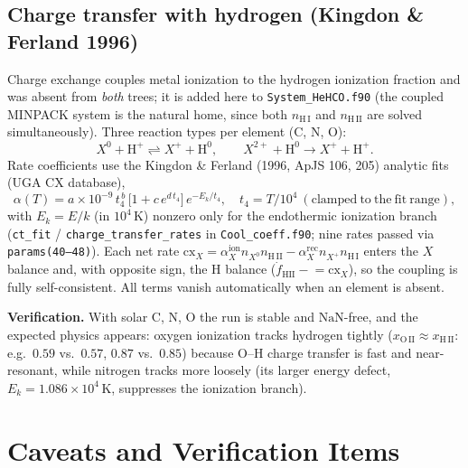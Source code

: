 \documentclass[english,a4paper]{my_memo}
\begin{document}
\subsection{Charge transfer with hydrogen (Kingdon \& Ferland 1996)}
\label{sec:cx}

Charge exchange couples metal ionization to the hydrogen ionization
fraction and was absent from \emph{both} trees; it is added here to
\texttt{System\_HeHCO.f90} (the coupled MINPACK system is the natural
home, since both \(n_{\mathrm{H\,I}}\) and \(n_{\mathrm{H\,II}}\) are
solved simultaneously).  Three reaction types per element (C, N, O):
\[
  X^{0} + \mathrm{H^+} \rightleftharpoons X^{+} + \mathrm{H^0},
  \qquad
  X^{2+} + \mathrm{H^0} \rightarrow X^{+} + \mathrm{H^+}.
\]
Rate coefficients use the Kingdon \& Ferland (1996, ApJS 106, 205)
analytic fits (UGA CX database),
\[
  \alpha(T) = a\times10^{-9}\,t_4^{\,b}\,
  \bigl[1 + c\,e^{d\,t_4}\bigr]\,e^{-E_k/t_4},
  \quad t_4 = T/10^4\ \mathrm{(clamped\ to\ the\ fit\ range)},
\]
with \(E_k=E/k\) (in \(10^4\)\,K) nonzero only for the endothermic
ionization branch (\texttt{ct\_fit} / \texttt{charge\_transfer\_rates}
in \texttt{Cool\_coeff.f90}; nine rates passed via \texttt{params(40--48)}).
Each net rate
\(\mathrm{cx}_X = \alpha^{\mathrm{ion}}_X n_{X^0} n_{\mathrm{H\,II}}
 - \alpha^{\mathrm{rec}}_X n_{X^+} n_{\mathrm{H\,I}}\)
enters the \(X\) balance and, with opposite sign, the H balance
(\(\dot{f}_{\mathrm{HII}} \mathrel{-}= \mathrm{cx}_X\)), so the coupling
is fully self-consistent.  All terms vanish automatically when an
element is absent.

\textbf{Verification.}  With solar C, N, O the run is stable and
\(\mathrm{NaN}\)-free, and the expected physics appears: oxygen
ionization tracks hydrogen tightly (\(x_{\mathrm{O\,II}}\approx
x_{\mathrm{H\,II}}\): e.g.\ \(0.59\) vs.\ \(0.57\), \(0.87\) vs.\
\(0.85\)) because O--H charge transfer is fast and near-resonant, while
nitrogen tracks more loosely (its larger energy defect,
\(E_k=1.086\times10^4\)\,K, suppresses the ionization branch).

\section{Caveats and Verification Items}
\end{document}
